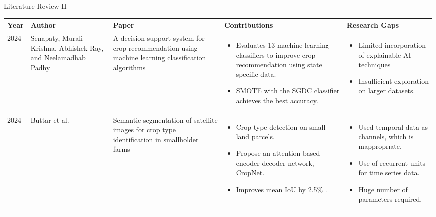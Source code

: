 \documentclass[aspectratio=169]{beamer}
\begin{document}
\begin{frame}{Literature Review II}
\begin{table}[ht]
    \centering
    \tiny
    \begin{tabular}{|p{0.3in} | p{0.78in}| p{0.68in}| p{1.2in}|p{1.35in}|}
    \hline
    \textbf{Year} & \textbf{Author} &  \textbf{Paper} & \textbf{Contributions} & \textbf{Research Gaps} \\
    \hline
    \vspace{1mm}
  2024 & Senapaty, Murali Krishna, Abhishek Ray, and Neelamadhab Padhy \cite{senapaty2024decision} & A decision support system for crop recommendation using machine learning classification algorithms  & \begin{itemize}
    \item Evaluates 13 machine learning classifiers to improve crop recommendation using state specific data.
    \item SMOTE with the SGDC classifier achieves the best accuracy.
\end{itemize}  & \begin{itemize}
    \item Limited incorporation of explainable AI techniques
    \item Insufficient exploration on larger datasets.
\end{itemize}  \\
    \hline
    \vspace{1mm}
2024 & Buttar et al. \cite{buttar2024semantic} & Semantic segmentation of satellite images for crop type identification in smallholder farms &  \begin{itemize}
    \item Crop type detection on small land parcels.
    \item Propose an attention based encoder-decoder network, CropNet.
    \item Improves mean IoU by 2.5\% .
\end{itemize} & \begin{itemize}
    \item Used temporal data as channels, which is inappropriate.
    \item Use of recurrent  units for time series data.
    \item Huge number of parameters required.


\end{itemize}
\end{tabular}
\end{table}
\end{frame}
\end{document}
